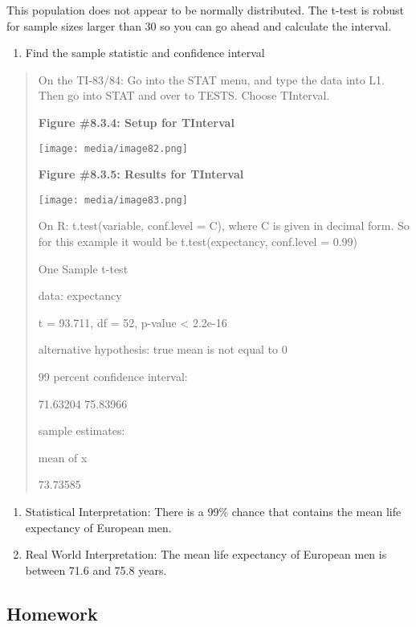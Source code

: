 \documentclass[]{book}
\providecommand{\tightlist}{%
  \setlength{\itemsep}{0pt}\setlength{\parskip}{0pt}}
\begin{document}
This population does not appear to be normally distributed. The t-test
is robust for sample sizes larger than 30 so you can go ahead and
calculate the interval.

\begin{enumerate}
\def\labelenumi{\arabic{enumi}.}
\setcounter{enumi}{2}
\tightlist
\item
  Find the sample statistic and confidence interval
\end{enumerate}

\begin{quote}
On the TI-83/84: Go into the STAT menu, and type the data into L1.
Then go into STAT and over to TESTS. Choose TInterval.

\textbf{Figure \#8.3.4: Setup for TInterval}

\texttt{[image: media/image82.png]}

\textbf{Figure \#8.3.5: Results for TInterval}

\texttt{[image: media/image83.png]}

On R: t.test(variable, conf.level = C), where C is given in decimal
form. So for this example it would be t.test(expectancy, conf.level =
0.99)

One Sample t-test

data: expectancy

t = 93.711, df = 52, p-value \textless{} 2.2e-16

alternative hypothesis: true mean is not equal to 0

99 percent confidence interval:

71.63204 75.83966

sample estimates:

mean of x

73.73585
\end{quote}

\begin{enumerate}
\def\labelenumi{\arabic{enumi}.}
\setcounter{enumi}{3}
\item
  Statistical Interpretation: There is a 99\% chance that contains the
  mean life expectancy of European men.
\item
  Real World Interpretation: The mean life expectancy of European men
  is between 71.6 and 75.8 years.
\end{enumerate}

\hypertarget{homework-25}{%
\subsection{Homework}\label{homework-25}}
\end{document}

